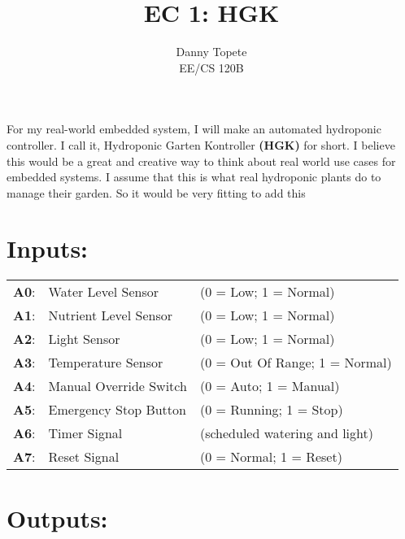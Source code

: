 \documentclass[12pt]{article}
\begin{document}
 
 
\title{EC 1: HGK}
\author{Danny Topete\\ %
EE/CS 120B}

\maketitle

\doublespacing

For my real-world embedded system, I will make an automated hydroponic controller.
I call it, Hydroponic Garten Kontroller \textbf{(HGK)} for short. 
I believe this would be a great and creative way to think about real world use cases for embedded systems.
I assume that this is what real hydroponic plants do to manage their garden.
So it would be very fitting to add this 

\pagebreak
\section{Inputs:}

\begin{tabular}{ l l l }
   \textbf{A0}: & Water Level Sensor & \quad (0 = Low; 1 = Normal) \\
   \textbf{A1}: & Nutrient Level Sensor & \quad (0 = Low; 1 = Normal) \\
   \textbf{A2}: & Light Sensor & \quad (0 = Low; 1 = Normal) \\
   \textbf{A3}: & Temperature Sensor & \quad (0 = Out Of Range; 1 = Normal) \\
   \textbf{A4}: & Manual Override Switch & \quad (0 = Auto; 1 = Manual) \\
   \textbf{A5}: & Emergency Stop Button & \quad (0 = Running; 1 = Stop) \\
   \textbf{A6}: & Timer Signal & \quad (scheduled watering and light) \\
   \textbf{A7}: & Reset Signal & \quad (0 = Normal; 1 = Reset) \\
\end{tabular}

\section{Outputs:}
\end{document}
